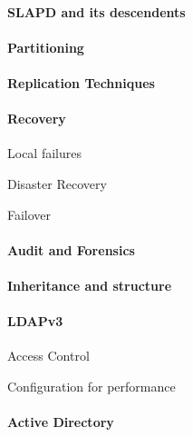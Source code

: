 \hypertarget{slapd-and-its-descendents}{%
\paragraph{SLAPD and its
descendents}\label{slapd-and-its-descendents}}

\hypertarget{partitioning}{%
\paragraph{Partitioning}\label{partitioning}}

\hypertarget{replication-techniques}{%
\paragraph{Replication Techniques}\label{replication-techniques}}

\hypertarget{recovery}{%
\paragraph{Recovery}\label{recovery}}

Local failures

Disaster Recovery

Failover

\hypertarget{audit-and-forensics}{%
\paragraph{Audit and Forensics}\label{audit-and-forensics}}

\hypertarget{inheritance-and-structure}{%
\paragraph{Inheritance and
structure}\label{inheritance-and-structure}}

\hypertarget{ldapv3}{%
\paragraph{LDAPv3}\label{ldapv3}}

Access Control

Configuration for performance

\hypertarget{active-directory}{%
\paragraph{Active Directory}\label{active-directory}}

